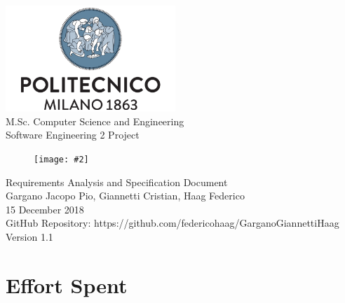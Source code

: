 \documentclass{report}
\newcommand{\image}[4]{
	\begin{figure}[H]
	\centering
	\texttt{[image: \#2]}
	\caption*{#3}
	\label{#4}

	\label{fig:nonfloat} %
	\end{figure}
}
\begin{document}
	\begin{titlepage}
		\centering	
		\vfill
		{
			\includegraphics[width =\linewidth, height = 4cm, keepaspectratio]{PolitecnicoLogo.png}
			\label{fig:PolitecnicoLogo}
			\large \\[2ex]M.Sc. Computer Science and Engineering\\
			\large Software Engineering 2 Project\\[9ex]			
			\image{5cm}{TrackMeLogo.png}{}{TrackMeLogo}
			\huge Requirements Analysis and Specification Document\\[4ex]

			\normalsize Gargano Jacopo Pio, Giannetti Cristian, Haag Federico\\[1.5ex]
			\normalsize 15 December 2018 \\[1.5ex]
			\normalsize GitHub Repository: https://github.com/federicohaag/GarganoGiannettiHaag\\[3ex]
			\normalsize Version 1.1


		}
		
	\end{titlepage}

	
	\newpage
	\tableofcontents
	\thispagestyle{fancy}
	
	\newpage
	
	
	
	
	
		
	\chapter{Effort Spent}
	\thispagestyle{fancy}
\end{document}
